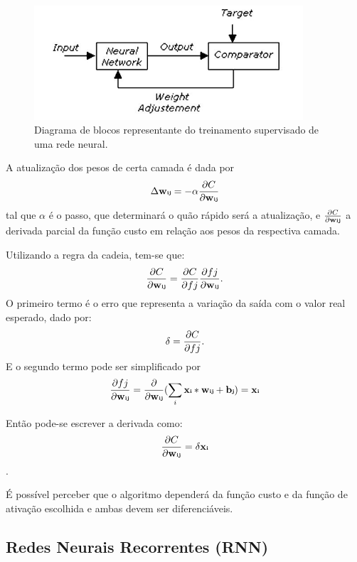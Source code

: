 \documentclass[
	12pt,				%
	oneside,			%
	a4paper,			%
	english,			%
	brazil				%
	]{abntex2}
\begin{document}
\begin{figure}[h]
\centering 
\includegraphics[width=10cm]{pictures/NetworkTrainer.JPG} %
\caption{Diagrama de blocos representante do treinamento supervisado de uma rede neural.}
\label{figura:NetTrain}
\end{figure}
 
	
	A atualização dos pesos de certa camada é dada por $$ \Delta \textbf{w{\tiny ij}} = - \alpha \frac{\partial C}{\partial \textbf{w{\tiny ij}}} $$ tal que $ \alpha $ é o passo, que determinará o quão rápido será a atualização, e $ \frac{\partial C}{\partial \textbf{w{\tiny ij}}} $ a derivada parcial da função custo em relação aos pesos da respectiva camada.
	
	Utilizando a regra da cadeia, tem-se que: $$ \frac{\partial C}{\partial \textbf{w{\tiny ij}}} = \frac{\partial C}{\partial f{\tiny j}} \frac{\partial f{\tiny j}}{\partial \textbf{w{\tiny ij}}}. $$ O primeiro termo é o erro que representa a variação da saída com o valor real esperado, dado por: $$ \delta{\tiny} = \frac{\partial C}{\partial f{\tiny j}}.$$	E o segundo termo pode ser simplificado por $$ \frac{\partial f{\tiny j}}{\partial  \textbf{w{\tiny ij}}} = \frac{\partial }{\partial  \textbf{w{\tiny ij}}} (\sum _{i} \textbf{x{\tiny i}} * \textbf{w{\tiny ij}} +  \textbf{b{\tiny j}}) =  \textbf{x{\tiny i}} $$
	
	Então pode-se escrever a derivada como: $$ \frac{\partial C}{\partial \textbf{w{\tiny ij}}} = \delta{\tiny} \textbf{x{\tiny i}} $$.
	
	É possível perceber que o algoritmo dependerá da função custo e da função de ativação escolhida e ambas devem ser diferenciáveis.
		
		\subsection{Redes Neurais Recorrentes (RNN)}
	
\end{document}
